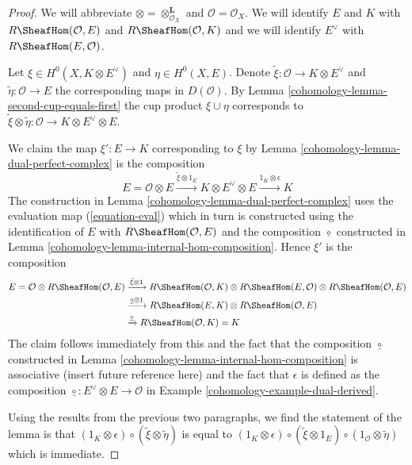 \begin{proof}

We will abbreviate $\otimes = \otimes_{\mathcal{O}_X}^\mathbf{L}$
and $\mathcal{O} = \mathcal{O}_X$. We will identify $E$ and $K$
with $R\SheafHom(\mathcal{O}, E)$ and $R\SheafHom(\mathcal{O}, K)$
and we will identify $E^\vee$ with $R\SheafHom(E, \mathcal{O})$.

\medskip\noindent
Let $\xi \in H^0(X, K \otimes E^\vee)$ and $\eta \in H^0(X, E)$.
Denote $\tilde \xi : \mathcal{O} \to K \otimes E^\vee$ and
$\tilde \eta : \mathcal{O} \to E$ the corresponding maps in
$D(\mathcal{O})$. By Lemma \ref{cohomology-lemma-second-cup-equals-first}
the cup product $\xi \cup \eta$ corresponds to
$\tilde \xi \otimes \tilde \eta : \mathcal{O} \to
K \otimes E^\vee \otimes E$.

\medskip\noindent
We claim the map $\xi' : E \to K$ corresponding to $\xi$ by
Lemma \ref{cohomology-lemma-dual-perfect-complex} is the composition
$$
E = \mathcal{O} \otimes E
\xrightarrow{\tilde \xi \otimes 1_E}
K \otimes E^\vee \otimes E
\xrightarrow{1_K \otimes \epsilon}
K
$$
The construction in Lemma \ref{cohomology-lemma-dual-perfect-complex}
uses the evaluation map (\ref{equation-eval}) which in turn
is constructed using the identification of $E$ with
$R\SheafHom(\mathcal{O}, E)$ and the composition
$\underline{\circ}$ constructed
in Lemma \ref{cohomology-lemma-internal-hom-composition}.
Hence $\xi'$ is the composition
\begin{align*}
E = \mathcal{O} \otimes
R\SheafHom(\mathcal{O}, E)
& \xrightarrow{\tilde \xi \otimes 1}
R\SheafHom(\mathcal{O}, K) \otimes
R\SheafHom(E, \mathcal{O}) \otimes
R\SheafHom(\mathcal{O}, E) \\
& \xrightarrow{\underline{\circ} \otimes 1}
R\SheafHom(E, K) \otimes R\SheafHom(\mathcal{O}, E) \\
& \xrightarrow{\underline{\circ}}
R\SheafHom(\mathcal{O}, K) = K
\end{align*}
The claim follows immediately from this and the fact that
the composition $\underline{\circ}$ constructed in
Lemma \ref{cohomology-lemma-internal-hom-composition} is associative
(insert future reference here) and the fact that $\epsilon$
is defined as the composition
$\underline{\circ} : E^\vee \otimes E \to \mathcal{O}$ in
Example \ref{cohomology-example-dual-derived}.

\medskip\noindent
Using the results from the previous two paragraphs, we find
the statement of the lemma is that
$(1_K \otimes \epsilon) \circ (\tilde \xi \otimes \tilde \eta)$
is equal to
$(1_K \otimes \epsilon) \circ (\tilde \xi \otimes 1_E)
\circ (1_\mathcal{O} \otimes \tilde \eta)$
which is immediate.
\end{proof}

